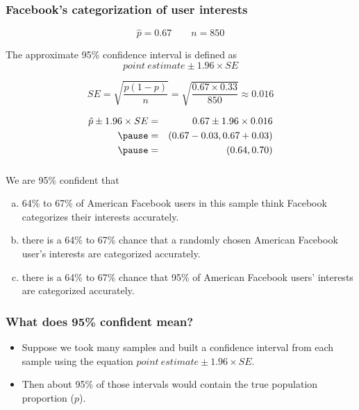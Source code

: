 \begin{frame}
\frametitle{Facebook's categorization of user interests}

\[ \hat{p} = 0.67 \qquad n = 850 \]

\pause

The approximate 95\% confidence interval is defined as 
\[ point~estimate \pm 1.96 \times SE \]

\pause

\vspace{-0.25cm}
\[ SE = \sqrt{\frac{p(1-p)}{n}} = \sqrt{\frac{0.67 \times 0.33}{850}} \approx 0.016 \]

\pause

\vspace{-0.25cm}
\begin{eqnarray*}
\hat{p} \pm 1.96 \times SE &=& 0.67 \pm 1.96 \times 0.016 \\
\pause
&=& (0.67 - 0.03, 0.67 + 0.03) \\
\pause
&=& (0.64, 0.70)
\end{eqnarray*}


\end{frame}


\begin{frame}
\frametitle{}


We are 95\% confident that
\begin{enumerate}[(a)]
\item 64\% to 67\% of American Facebook users in this sample think Facebook categorizes their interests accurately.
\item there is a 64\% to 67\% chance that a randomly chosen American Facebook user's interests are categorized accurately.
\item there is a 64\% to 67\% chance that 95\% of American Facebook users' interests are categorized accurately.
\end{enumerate}

\end{frame}


\begin{frame}
\frametitle{What does 95\% confident mean?}

\begin{itemize}

\item Suppose we took many samples and built a confidence interval from each sample using the equation $point~estimate \pm 1.96 \times SE$.

\item Then about 95\% of those intervals would contain the true population proportion ($p$). 

\end{itemize}

\end{frame}

